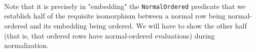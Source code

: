\documentclass[authoryear, acmsmall, screen, review, nonacm]{acmart} %
\begin{document}
\begin{code}%
\>[0]\AgdaSpace{}%
\AgdaSymbol{:}\AgdaSpace{}%
\AgdaSpace{}%
\AgdaSpace{}%
\AgdaSpace{}%
\AgdaSpace{}%
\AgdaSpace{}%
\AgdaSpace{}%
\<%
\\
\>[0]\AgdaSpace{}%
\AgdaSymbol{:}\AgdaSpace{}%
\AgdaSpace{}%
\AgdaSpace{}%
\AgdaSpace{}%
\AgdaOperator{\AgdaInductiveConstructor{R[}}\AgdaSpace{}%
\AgdaSpace{}%
\AgdaOperator{\AgdaInductiveConstructor{]}}\AgdaSpace{}%
\AgdaSpace{}%
\AgdaSpace{}%
\AgdaSpace{}%
\AgdaSpace{}%
\AgdaOperator{\AgdaInductiveConstructor{R[}}\AgdaSpace{}%
\AgdaSpace{}%
\AgdaOperator{\AgdaInductiveConstructor{]}}\<%
\\
\>[0]\AgdaSpace{}%
\AgdaSymbol{:}\AgdaSpace{}%
\AgdaSpace{}%
\AgdaSpace{}%
\AgdaSpace{}%
\AgdaSpace{}%
\AgdaSpace{}%
\AgdaSpace{}%
\<%
\\
\>[0]\AgdaSpace{}%
\AgdaSymbol{:}\AgdaSpace{}%
\AgdaSpace{}%
\AgdaSpace{}%
\AgdaOperator{\AgdaInductiveConstructor{R[}}\AgdaSpace{}%
\AgdaSpace{}%
\AgdaOperator{\AgdaInductiveConstructor{]}}\AgdaSpace{}%
\AgdaSpace{}%
\AgdaSpace{}%
\AgdaSpace{}%
\AgdaSpace{}%
\AgdaOperator{\AgdaInductiveConstructor{R[}}\AgdaSpace{}%
\AgdaSpace{}%
\AgdaOperator{\AgdaInductiveConstructor{]}}\<%
\end{code}

Note that it is precisely in "embedding" the \verb!NormalOrdered! predicate that we establish half of the requisite isomorphism between a normal row being normal-ordered and its embedding being ordered. We will have to show the other half (that is, that ordered rows have normal-ordered evaluations) during normalization.

\begin{code}%
\>[0]\AgdaSpace{}%
\AgdaSymbol{:}\AgdaSpace{}%
%
\>[4300I]\AgdaSymbol{(}\AgdaSpace{}%
\AgdaSymbol{:}\AgdaSpace{}%
\AgdaSpace{}%
\AgdaSpace{}%
\AgdaSpace{}%
\AgdaOperator{\AgdaInductiveConstructor{R[}}\AgdaSpace{}%
\AgdaSpace{}%
\AgdaOperator{\AgdaInductiveConstructor{]}}\AgdaSymbol{)}\AgdaSpace{}%
\AgdaSpace{}%
\AgdaSpace{}%
\AgdaSpace{}%
\<%
\\
\>[.][@{}l@{}]\<[4300I]%
\>[13]\AgdaSpace{}%
\AgdaSymbol{(}\AgdaSpace{}%
\AgdaSymbol{)}\<%
\end{code}
\end{document}
